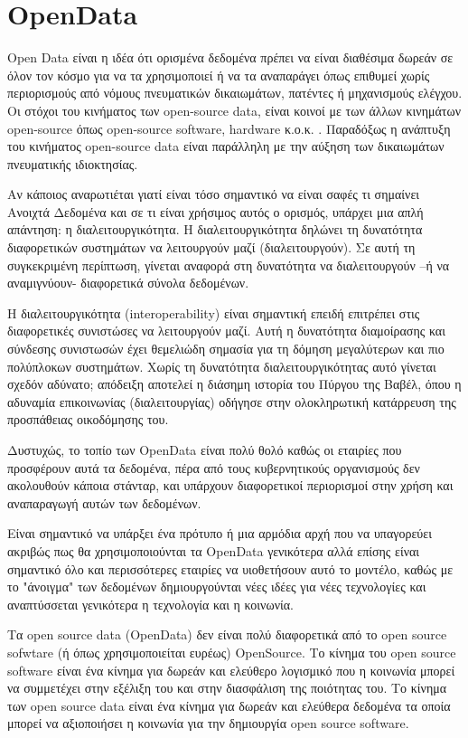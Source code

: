 \chapter{OpenData}

Open Data είναι η ιδέα ότι ορισμένα δεδομένα πρέπει να είναι διαθέσιμα δωρεάν σε όλον τον κόσμο για να τα χρησιμοποιεί ή να τα αναπαράγει όπως επιθυμεί χωρίς περιορισμούς από νόμους πνευματικών δικαιωμάτων, πατέντες ή μηχανισμούς ελέγχου. Οι στόχοι του κινήματος των open-source data, είναι κοινοί με των άλλων κινημάτων open-source όπως open-source software, hardware κ.ο.κ. \citep{wiki:opendata}.
Παραδόξως η ανάπτυξη του κινήματος open-source data είναι παράλληλη με την αύξηση των δικαιωμάτων πνευματικής ιδιοκτησίας.

Αν κάποιος αναρωτιέται γιατί είναι τόσο σημαντικό να είναι σαφές τι σημαίνει Ανοιχτά Δεδομένα και σε τι είναι χρήσιμος αυτός ο ορισμός, υπάρχει μια απλή απάντηση: η διαλειτουργικότητα. Η διαλειτουργικότητα δηλώνει τη δυνατότητα διαφορετικών συστημάτων να λειτουργούν μαζί (διαλειτουργούν). Σε αυτή τη συγκεκριμένη περίπτωση, γίνεται αναφορά στη δυνατότητα να διαλειτουργούν –ή να αναμιγνύουν- διαφορετικά σύνολα δεδομένων.

Η διαλειτουργικότητα (interoperability) είναι σημαντική επειδή επιτρέπει στις διαφορετικές συνιστώσες να λειτουργούν μαζί. Αυτή η δυνατότητα διαμοίρασης και σύνδεσης συνιστωσών έχει θεμελιώδη σημασία για τη δόμηση μεγαλύτερων και πιο πολύπλοκων συστημάτων. Χωρίς τη δυνατότητα διαλειτουργικότητας αυτό γίνεται σχεδόν αδύνατο; απόδειξη αποτελεί η διάσημη ιστορία του Πύργου της Βαβέλ, όπου η αδυναμία επικοινωνίας (διαλειτουργίας) οδήγησε στην ολοκληρωτική κατάρρευση της προσπάθειας οικοδόμησης του. \citep{github:opendata}

Δυστυχώς, το τοπίο των OpenData είναι πολύ θολό καθώς οι εταιρίες που προσφέρουν αυτά τα δεδομένα, πέρα από τους κυβερνητικούς οργανισμούς δεν ακολουθούν κάποια στάνταρ, και υπάρχουν διαφορετικοί περιορισμοί στην χρήση και αναπαραγωγή αυτών των δεδομένων. 

Είναι σημαντικό να υπάρξει ένα πρότυπο ή μια αρμόδια αρχή που να υπαγορεύει ακριβώς πως θα χρησιμοποιούνται τα OpenData  γενικότερα αλλά επίσης είναι σημαντικό όλο και περισσότερες εταιρίες να υιοθετήσουν αυτό το μοντέλο, καθώς με το "άνοιγμα" των δεδομένων δημιουργούνται νέες ιδέες για νέες τεχνολογίες και αναπτύσσεται γενικότερα η τεχνολογία και η κοινωνία.

Τα open source data (OpenData) δεν είναι πολύ διαφορετικά από το open source sofwtare (ή όπως χρησιμοποιείται ευρέως) OpenSource. Το κίνημα του open source software είναι ένα κίνημα για δωρεάν και ελεύθερο λογισμικό που η κοινωνία μπορεί να συμμετέχει στην εξέλιξη του και στην διασφάλιση της ποιότητας του. Το κίνημα των open source data είναι ένα κίνημα για δωρεάν και ελεύθερα δεδομένα τα οποία μπορεί να αξιοποιήσει η κοινωνία για την δημιουργία open source software. 

